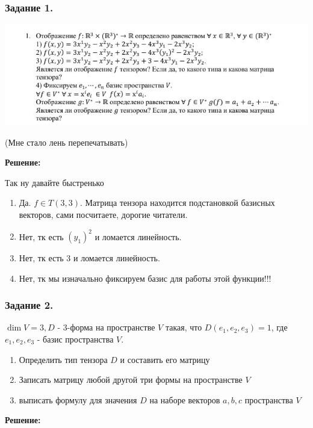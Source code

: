 \subsubsection{Задание 1.}

\begin{center}
   \includegraphics{assets/practice-2-task-1.jpg}
\end{center}

(Мне стало лень перепечатывать)

\textbf{Решение:}

Так ну давайте быстренько
\begin{enumerate}
    \item Да. $f \in T(3,3)$. Матрица тензора находится подстановкой базисных векторов, сами посчитаете, дорогие читатели.
    \item Нет, тк есть $(y_1)^2$ и ломается линейность.
    \item Нет, тк есть $3$ и ломается линейность.
    \item Нет, тк мы изначально фиксируем базис для работы этой функции!!!
\end{enumerate}

\subsubsection{Задание 2.}

$\dim V = 3, D$ - 3-форма на пространстве $V$ такая, что $D(e_1,e_2,e_3) = 1$, где $e_1,e_2,e_3$ - базис пространства $V$.
\begin{enumerate}
    \item Определить тип тензора $D$ и составить его матрицу
    \item Записать матрицу любой другой три формы на пространстве $V$
    \item выписать формулу для значения $D$ на наборе векторов $a,b,c$ пространства $V$
\end{enumerate}

\textbf{Решение:}

